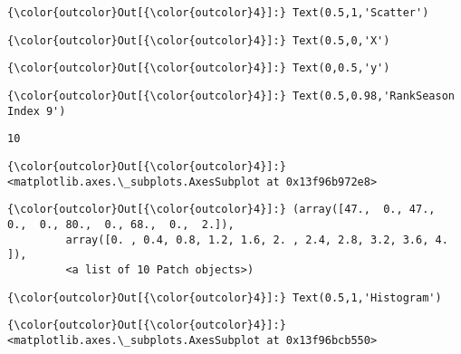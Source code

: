 \documentclass[11pt]{article}
\begin{document}
\begin{Verbatim}[commandchars=\\\{\}]
{\color{outcolor}Out[{\color{outcolor}4}]:} Text(0.5,1,'Scatter')
\end{Verbatim}
            
\begin{Verbatim}[commandchars=\\\{\}]
{\color{outcolor}Out[{\color{outcolor}4}]:} Text(0.5,0,'X')
\end{Verbatim}
            
\begin{Verbatim}[commandchars=\\\{\}]
{\color{outcolor}Out[{\color{outcolor}4}]:} Text(0,0.5,'y')
\end{Verbatim}
            
\begin{Verbatim}[commandchars=\\\{\}]
{\color{outcolor}Out[{\color{outcolor}4}]:} Text(0.5,0.98,'RankSeason Index 9')
\end{Verbatim}
            
    \begin{Verbatim}[commandchars=\\\{\}]
10

    \end{Verbatim}

\begin{Verbatim}[commandchars=\\\{\}]
{\color{outcolor}Out[{\color{outcolor}4}]:} <matplotlib.axes.\_subplots.AxesSubplot at 0x13f96b972e8>
\end{Verbatim}
            
\begin{Verbatim}[commandchars=\\\{\}]
{\color{outcolor}Out[{\color{outcolor}4}]:} (array([47.,  0., 47.,  0.,  0., 80.,  0., 68.,  0.,  2.]),
         array([0. , 0.4, 0.8, 1.2, 1.6, 2. , 2.4, 2.8, 3.2, 3.6, 4. ]),
         <a list of 10 Patch objects>)
\end{Verbatim}
            
\begin{Verbatim}[commandchars=\\\{\}]
{\color{outcolor}Out[{\color{outcolor}4}]:} Text(0.5,1,'Histogram')
\end{Verbatim}
            
\begin{Verbatim}[commandchars=\\\{\}]
{\color{outcolor}Out[{\color{outcolor}4}]:} <matplotlib.axes.\_subplots.AxesSubplot at 0x13f96bcb550>
\end{Verbatim}
            
\end{document}
